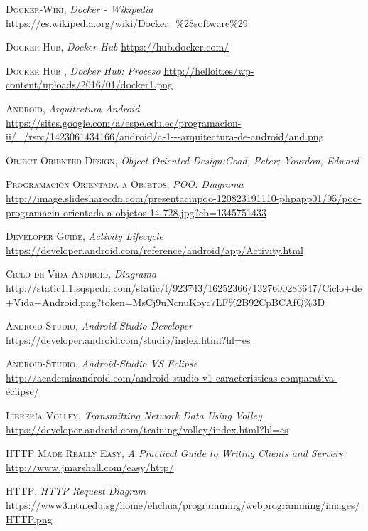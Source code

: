 \documentclass[a4paper,11pt]{book}
\begin{document}
\begin{thebibliography}{aaaa}
 \textsc{Docker-Wiki},
\textit{Docker - Wikipedia}
\url{https://es.wikipedia.org/wiki/Docker_\%28software\%29} 


 \textsc{Docker Hub},
\textit{Docker Hub}
\url{https://hub.docker.com/} 

 \textsc{Docker Hub },
\textit{Docker Hub: Proceso}
\url{http://helloit.es/wp-content/uploads/2016/01/docker1.png}








 \textsc{Android},
\textit{Arquitectura Android }
\url{https://sites.google.com/a/espe.edu.ec/programacion-ii/_/rsrc/1423061434166/android/a-1---arquitectura-de-android/and.png} 

 \textsc{Object-Oriented Design},
\textit{Object-Oriented Design:Coad, Peter; Yourdon, Edward }
\url{} 

 \textsc{Programación Orientada a Objetos},
\textit{POO: Diagrama }
\url{http://image.slidesharecdn.com/presentacinpoo-120823191110-phpapp01/95/poo-programacin-orientada-a-objetos-14-728.jpg?cb=1345751433} 

 \textsc{Developer Guide},
\textit{Activity Lifecycle }
\url{https://developer.android.com/reference/android/app/Activity.html} 


 \textsc{Ciclo de Vida Android},
\textit{Diagrama}
\url{http://static1.1.sqspcdn.com/static/f/923743/16252366/1327600283647/Ciclo+de+Vida+Android.png?token=MsCj9uNcnuKoyc7LF%2B92CpBCAfQ%3D} 




 \textsc{Android-Studio},
\textit{Android-Studio-Developer}
\url{https://developer.android.com/studio/index.html?hl=es} 

 \textsc{Android-Studio},
\textit{Android-Studio VS Eclipse}
\url{http://academiaandroid.com/android-studio-v1-caracteristicas-comparativa-eclipse/} 

 \textsc{Librería Volley},
\textit{Transmitting Network Data Using Volley}
\url{https://developer.android.com/training/volley/index.html?hl=es}

 \textsc{HTTP Made Really Easy},
\textit{A Practical Guide to Writing Clients and Servers}
\url{http://www.jmarshall.com/easy/http/} 


 \textsc{HTTP},
\textit{HTTP Request Diagram}
\url{https://www3.ntu.edu.sg/home/ehchua/programming/webprogramming/images/HTTP.png} 





\end{thebibliography}
\end{document}
